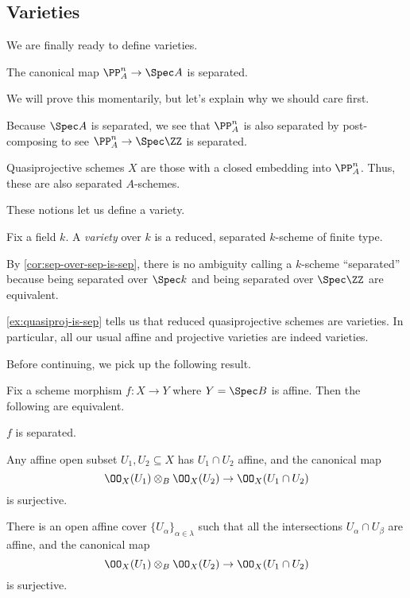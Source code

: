 \documentclass[../notes.tex]{subfiles}
\begin{document}
\subsection{Varieties}
We are finally ready to define varieties.
\begin{proposition} \label{prop:proj-is-sep}
	The canonical map $\PP^n_A\to\Spec A$ is separated.
\end{proposition}
We will prove this momentarily, but let's explain why we should care first.
\begin{example}
	Because $\Spec A$ is separated, we see that $\PP^n_A$ is also separated by post-composing to see $\PP^n_A\to\Spec\ZZ$ is separated.
\end{example}
\begin{example} \label{ex:quasiproj-is-sep}
	Quasiprojective schemes $X$ are those with a closed embedding into $\PP^n_A$. Thus, these are also separated $A$-schemes.
\end{example}
These notions let us define a variety.
\begin{definition}[Variety]
	Fix a field $k$. A \textit{variety} over $k$ is a reduced, separated $k$-scheme of finite type.
\end{definition}
\begin{remark}
	By \autoref{cor:sep-over-sep-is-sep}, there is no ambiguity calling a $k$-scheme ``separated'' because being separated over $\Spec k$ and being separated over $\Spec\ZZ$ are equivalent.
\end{remark}
\begin{example}
	\autoref{ex:quasiproj-is-sep} tells us that reduced quasiprojective schemes are varieties. In particular, all our usual affine and projective varieties are indeed varieties.
\end{example}
Before continuing, we pick up the following result.
\begin{proposition}
	Fix a scheme morphism $f\colon X\to Y$ where $Y=\Spec B$ is affine. Then the following are equivalent.
	\begin{listalph}
		\item $f$ is separated.
		\item Any affine open subset $U_1,U_2\subseteq X$ has $U_1\cap U_2$ affine, and the canonical map
		\[\OO_X(U_1)\otimes_B\OO_X(U_2)\to\OO_X(U_1\cap U_2)\]
		is surjective.
		\item There is an open affine cover $\{U_\alpha\}_{\alpha\in\lambda}$ such that all the intersections $U_\alpha\cap U_\beta$ are affine, and the canonical map
		\[\OO_X(U_1)\otimes_B\OO_X(U_2)\to\OO_X(U_1\cap U_2)\]
		is surjective.
	\end{listalph}
\end{proposition}
\end{document}
